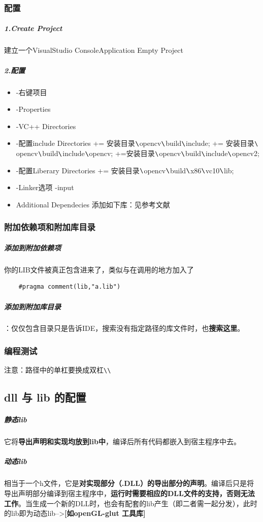 \documentclass[UTF8,a4paper,12pt]{ctexbook} %
\begin{document}
			\subsubsection{配置}
				\subparagraph{1.Create Project}建立一个VisualStudio  ConsoleApplication Empty Project
				\subparagraph{2.配置}
				\begin{itemize}[itemindent = 2em]
					\item -右键项目
					\item -Properties
					\item -VC++ Directories
					\item -配置include Directories += 安装目录$ \verb|\|$opencv$ \verb|\|$build$ \verb|\|$include; += 安装目录$ \verb|\|$ opencv$ \verb|\|$build$ \verb|\|$include$ \verb|\|$opencv; +=安装目录$ \verb|\|$opencv$ \verb|\|$build$ \verb|\|$include$ \verb|\|$opencv2;
					\item -配置Liberary Directories += 安装目录$ \verb|\|$opencv$ \verb|\|$build$ \verb|\|$x86$ \verb|\|$vc10$ \verb|\|$lib;
					\item -Linker选项 -input
					\item Additional Dependecies 添加如下库：见参考文献
				\end{itemize}
			
			\subsubsection{附加依赖项和附加库目录}
				\subparagraph{添加到附加依赖项} 你的LIB文件被真正包含进来了，类似与在调用的地方加入了
					\begin{lstlisting}
	#pragma comment(lib,"a.lib")
					\end{lstlisting}
				
				\subparagraph{添加到附加库目录}：仅仅包含目录只是告诉IDE，搜索没有指定路径的库文件时，也\textbf{搜索这里}。
			
			\subsubsection{编程测试}注意：路径中的单杠要换成双杠\verb|\\|
			
		\subsection{dll 与 lib 的配置}
			\subparagraph{静态lib}它将\textbf{导出声明和实现均放到lib中}，编译后所有代码都嵌入到宿主程序中去。
			\subparagraph{动态lib}相当于一个h文件，它是\textbf{对实现部分（.DLL）的导出部分的声明}。编译后只是将导出声明部分编译到宿主程序中，\textbf{运行时需要相应的DLL文件的支持，否则无法工作}。当生成一个新的DLL时，也会有配套的lib产生（即二者需一起分发），此时的lib即为动态lib-->\textbf{[如openGL-glut 工具库]}
			
\end{document}
